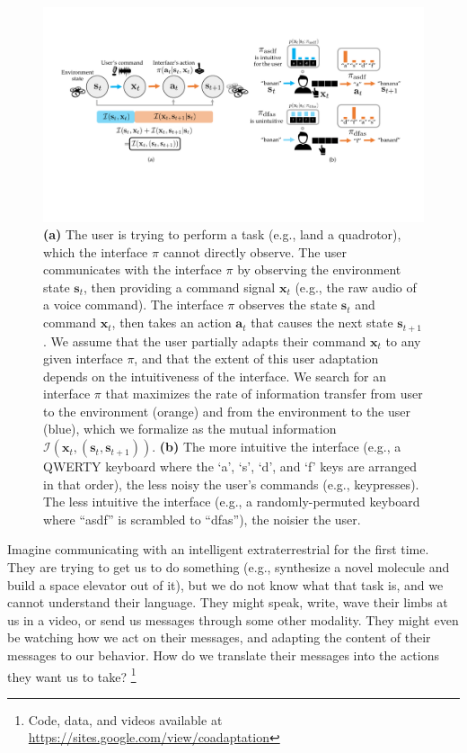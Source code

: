 \documentclass{article}
\newcommand{\bx}{\mathbf{x}}
\newcommand{\bs}{\mathbf{s}}
\newcommand{\ba}{\mathbf{a}}
\newcommand{\mi}{\mathcal{I}}
\newcommand\blfootnote[1]{%
  \begingroup
  \renewcommand\thefootnote{}\footnote{#1}%
  \addtocounter{footnote}{-1}%
  \endgroup
}
\begin{document}
\begin{figure}[t]
  \begin{center}
    \includegraphics[width=\linewidth]{schematic.pdf}
    \caption{\textbf{(a)} The user is trying to perform a task (e.g., land a quadrotor), which the interface $\pi$ cannot directly observe. The user communicates with the interface $\pi$ by observing the environment state $\bs_t$, then providing a command signal $\bx_t$ (e.g., the raw audio of a voice command). The interface $\pi$ observes the state $\bs_t$ and command $\bx_t$, then takes an action $\ba_t$ that causes the next state $\bs_{t+1}$. We assume that the user partially adapts their command $\bx_t$ to any given interface $\pi$, and that the extent of this user adaptation depends on the intuitiveness of the interface. We search for an interface $\pi$ that maximizes the rate of information transfer from user to the environment (orange) and from the environment to the user (blue), which we formalize as the mutual information $\mi(\bx_t, (\bs_t, \bs_{t+1}))$. \textbf{(b)} The more intuitive the interface (e.g., a QWERTY keyboard where the `a', `s', `d', and `f' keys are arranged in that order), the less noisy the user's commands (e.g., keypresses). The less intuitive the interface (e.g., a randomly-permuted keyboard where ``asdf'' is scrambled to ``dfas''), the noisier the user.}
        \label{fig:schematic}
  \end{center}
\end{figure}

Imagine communicating with an intelligent extraterrestrial for the first time.
They are trying to get us to do something (e.g., synthesize a novel molecule and build a space elevator out of it), but we do not know what that task is, and we cannot understand their language.
They might speak, write, wave their limbs at us in a video, or send us messages through some other modality.
They might even be watching how we act on their messages, and adapting the content of their messages to our behavior.
How do we translate their messages into the actions they want us to take?\blfootnote{Code, data, and videos available at \url{https://sites.google.com/view/coadaptation}}
\end{document}
